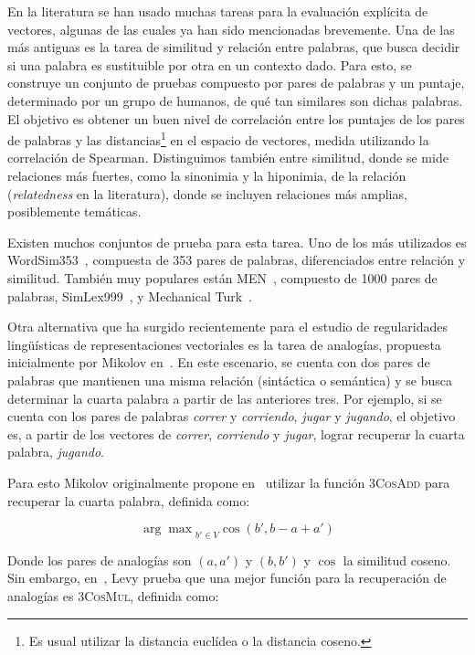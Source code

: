 En la literatura se han usado muchas tareas para la evaluación explícita de vectores, algunas de las
cuales ya han sido mencionadas brevemente. Una de las más antiguas es la tarea de similitud y
relación entre palabras, que busca decidir si una palabra es sustituible por otra en un contexto
dado. Para esto, se construye un conjunto de pruebas compuesto por pares de palabras y un puntaje,
determinado por un grupo de humanos, de qué tan similares son dichas palabras. El objetivo es
obtener un buen nivel de correlación entre los puntajes de los pares de palabras y las
distancias\footnote{Es usual utilizar la distancia euclídea o la distancia coseno.} en el espacio de
vectores, medida utilizando la correlación de Spearman. Distinguimos también entre similitud, donde
se mide relaciones más fuertes, como la sinonimia y la hiponimia, de la relación
(\textit{relatedness} en la literatura), donde se incluyen relaciones más amplias, posiblemente
temáticas.

Existen muchos conjuntos de prueba para esta tarea. Uno de los más utilizados es
WordSim353~\cite{Finkelstein2002}, compuesta de 353 pares de palabras, diferenciados entre relación
y similitud. También muy populares están MEN~\cite{Bruni2012}, compuesto de 1000 pares de palabras,
SimLex999~\cite{Hill2014}, y Mechanical Turk~\cite{Radinsky2011}.

Otra alternativa que ha surgido recientemente para el estudio de regularidades lingüísticas de
representaciones vectoriales es la tarea de analogías, propuesta inicialmente por Mikolov
en~\cite{Mikolov2013a}. En este escenario, se cuenta con dos pares de palabras que mantienen una
misma relación (sintáctica o semántica) y se busca determinar la cuarta palabra a partir de las
anteriores tres. Por ejemplo, si se cuenta con los pares de palabras \textit{correr} y
\textit{corriendo}, \textit{jugar} y \textit{jugando}, el objetivo es, a partir de los vectores de
\textit{correr}, \textit{corriendo} y \textit{jugar}, lograr recuperar la cuarta palabra,
\textit{jugando}.

Para esto Mikolov originalmente propone en~\cite{Mikolov2013a} utilizar la función \textsc{3CosAdd}
para recuperar la cuarta palabra, definida como:

\[
  {\arg \max}_{b' \in V} \cos(b', b - a + a')
\]

Donde los pares de analogías son $(a, a')$ y $(b, b')$ y $\cos$ la similitud coseno. Sin embargo,
en~\cite{Levy2014b}, Levy prueba que una mejor función para la recuperación de analogías es
\textsc{3CosMul}, definida como:

